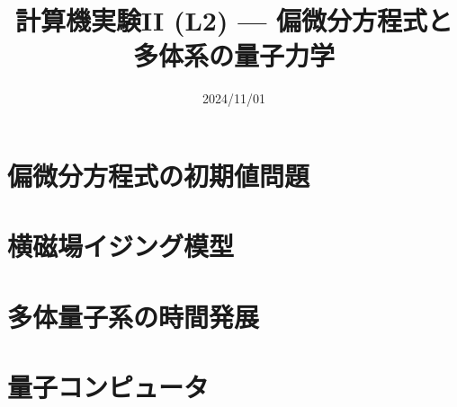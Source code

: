 \documentclass[10pt,dvipdfmx]{beamer}
\title{計算機実験II (L2) --- 偏微分方程式と多体系の量子力学}
\date{2024/11/01}
\begin{document}
\begin{frame}
  \titlepage
  \tableofcontents
\end{frame}



\section{偏微分方程式の初期値問題}















% 
% 
% 

\section{横磁場イジング模型}





\section{多体量子系の時間発展}





\section{量子コンピュータ}





\end{document}
